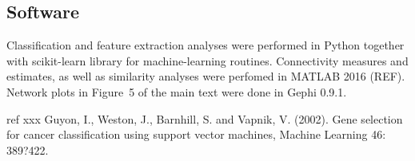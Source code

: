 \documentclass{article}
\begin{document}
  
\subsection{Software}

Classification and feature extraction analyses were performed in Python together with scikit-learn library for machine-learning routines. Connectivity measures and estimates, as well as similarity analyses were perfomed in MATLAB 2016 (REF). Network plots in Figure~5 of the main text were done in Gephi 0.9.1.






ref xxx Guyon, I., Weston, J., Barnhill, S. and Vapnik, V. (2002). Gene selection for
cancer classification using support vector machines, Machine Learning
46: 389?422.  
  
\end{document}
